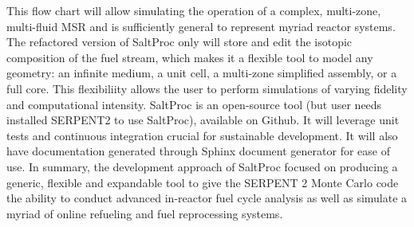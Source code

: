 This flow chart will allow simulating the operation of a complex, multi-zone, 
multi-fluid \gls{MSR} and is sufficiently general to represent myriad reactor 
systems. The refactored version of SaltProc only will store and edit the 
isotopic composition of the fuel stream, which makes it a flexible tool to 
model any geometry: an infinite medium, a unit cell, a multi-zone simplified 
assembly, or a full core. This flexibiliity allows the user to perform 
simulations of varying fidelity and computational intensity. SaltProc is an 
open-source tool (but user needs installed SERPENT2 to use SaltProc), 
available on Github. It will leverage unit tests and continuous integration 
crucial for sustainable development. It will also have documentation
generated through Sphinx document generator for ease of use. In summary, the 
development approach of SaltProc focused on producing a generic, flexible and 
expandable tool to give the SERPENT 2 Monte Carlo code the ability to conduct 
advanced in-reactor fuel cycle analysis as well as simulate a myriad of 
online refueling and fuel reprocessing systems.


